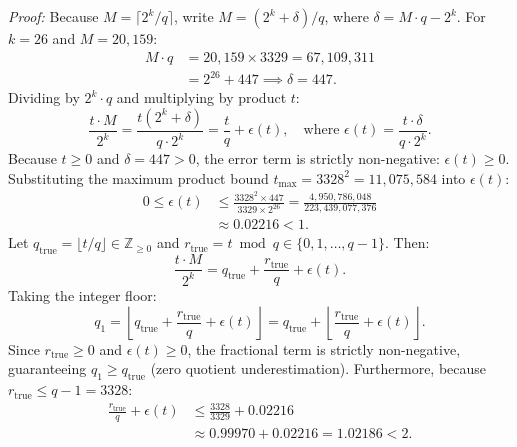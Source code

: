 \vspace{0.15cm}
\noindent\textit{Proof:}
Because $M = \lceil 2^k/q \rceil$, write $M = (2^k + \delta)/q$, where $\delta = M \cdot q - 2^k$. For $k = 26$ and $M = 20,159$:
\begin{equation}
\label{eq:delta_calc}
\begin{aligned}
M \cdot q &= 20,159 \times 3329 = 67,109,311 \\
&= 2^{26} + 447 \implies \delta = 447.
\end{aligned}
\end{equation}
Dividing by $2^k \cdot q$ and multiplying by product $t$:
\begin{equation}
\label{eq:quotient_expansion}
\frac{t \cdot M}{2^k} = \frac{t(2^k + \delta)}{q \cdot 2^k} = \frac{t}{q} + \epsilon(t), \quad \text{where } \epsilon(t) = \frac{t \cdot \delta}{q \cdot 2^k}.
\end{equation}
Because $t \ge 0$ and $\delta = 447 > 0$, the error term is strictly non-negative: $\epsilon(t) \ge 0$. Substituting the maximum product bound $t_{\max} = 3328^2 = 11,075,584$ into $\epsilon(t)$:
\begin{equation}
\label{eq:epsilon_bound}
\begin{aligned}
0 \le \epsilon(t) &\le \frac{3328^2 \times 447}{3329 \times 2^{26}} = \frac{4,950,786,048}{223,439,077,376} \\
&\approx 0.02216 < 1.
\end{aligned}
\end{equation}
Let $q_{\text{true}} = \lfloor t/q \rfloor \in \mathbb{Z}_{\ge 0}$ and $r_{\text{true}} = t \bmod q \in \{0, 1, \dots, q-1\}$. Then:
\begin{equation}
\label{eq:floor_expansion}
\frac{t \cdot M}{2^k} = q_{\text{true}} + \frac{r_{\text{true}}}{q} + \epsilon(t).
\end{equation}
Taking the integer floor:
\begin{equation}
\label{eq:q1_floor}
q_1 = \left\lfloor q_{\text{true}} + \frac{r_{\text{true}}}{q} + \epsilon(t) \right\rfloor = q_{\text{true}} + \left\lfloor \frac{r_{\text{true}}}{q} + \epsilon(t) \right\rfloor.
\end{equation}
Since $r_{\text{true}} \ge 0$ and $\epsilon(t) \ge 0$, the fractional term is strictly non-negative, guaranteeing $q_1 \ge q_{\text{true}}$ (zero quotient underestimation). Furthermore, because $r_{\text{true}} \le q - 1 = 3328$:
\begin{equation}
\label{eq:fractional_upper}
\begin{aligned}
\frac{r_{\text{true}}}{q} + \epsilon(t) &\le \frac{3328}{3329} + 0.02216 \\
&\approx 0.99970 + 0.02216 = 1.02186 < 2.
\end{aligned}
\end{equation}
